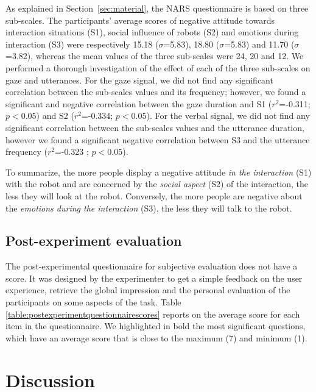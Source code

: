 \documentclass[twocolumn]{svjour3}          %
\begin{document}
As explained in Section~\ref{sec:material}, the NARS questionnaire is based on three sub-scales.
The participants' average scores of negative attitude towards interaction situations (S1), social influence of robots (S2) and emotions during interaction (S3) were respectively 15.18 ($\sigma$=5.83), 18.80 ($\sigma$=5.83) and 11.70 ($\sigma$=3.82), whereas the mean values of the three sub-scales were 24, 20 and 12. 
We performed a thorough investigation of the effect of each of the three sub-scales on gaze and utterances. 
For the gaze signal, we did not find any significant correlation between the sub-scales values and its frequency; however, we found a significant and negative correlation between the gaze duration and S1 ($r^2$=-0.311; \textbf{$p<0.05$}) and S2 ($r^2$=-0.334; \textbf{$p<0.05$}).
For the verbal signal, we did not find any significant correlation between the sub-scales values and the utterance duration, however we found a significant negative correlation between S3 and the utterance frequency ($r^2$=-0.323 ; \textbf{$p<0.05$}).

To summarize, the more people display a negative attitude \textit{in the interaction} (S1) with the robot and are concerned by the \textit{social aspect} (S2) of the interaction, the less they will look at the robot. Conversely, the more people are negative about the \textit{emotions during the interaction} (S3), the less they will talk to the robot.



\subsection{Post-experiment evaluation}

The post-experimental questionnaire for subjective evaluation does not have a score. 
It was designed by the experimenter to get a simple feedback on the user experience, retrieve the global impression and the personal evaluation of the participants on some aspects of the task.
Table \ref{table:postexperimentquestionnairescores} reports on the average score for each item in the questionnaire. We highlighted in bold the most significant questions, which have an average score that is close to the maximum (7) and minimum (1).






\section{Discussion}
\end{document}
